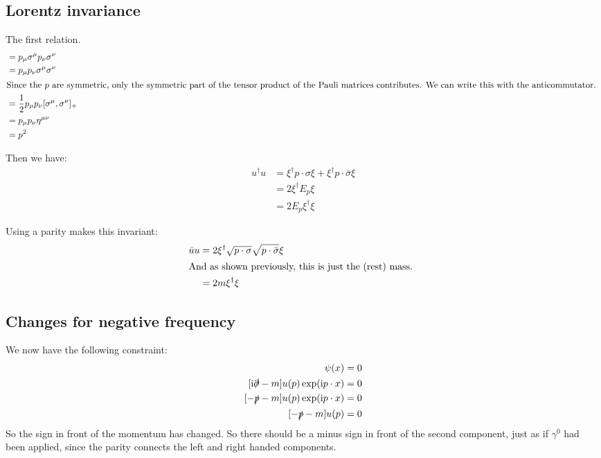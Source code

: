 \documentclass[11pt, english, fleqn, DIV=15, headinclude, BCOR=1cm]{scrartcl}
\begin{document}
\subsection{Lorentz invariance}

The first relation.
\begin{align*}
    [p \cdot \sigma][p \cdot \bar\sigma]
    &= p_\mu \sigma^\mu p_\nu \sigma^\nu \\
    &= p_\mu p_\nu \sigma^\mu \sigma^\nu \\
    \intertext{%
        Since the $p$ are symmetric, only the symmetric part of the tensor
        product of the Pauli matrices contributes. We can write this with the
        anticommutator.
    }
    &= \frac12 p_\mu p_\nu [\sigma^\mu, \sigma^\nu]_+ \\
    &= p_\mu p_\nu \eta^{\mu\nu} \\
    &= p^2
\end{align*}

Then we have:
\begin{align*}
    u^\dagger u
    &= \xi^\dagger p \cdot \sigma \xi + \xi^\dagger p \cdot \bar\sigma \xi \\
    &= 2 \xi^\dagger E_p \xi \\
    &= 2 E_p \xi^\dagger \xi
\end{align*}

Using a parity makes this invariant:
\begin{align*}
    \bar u u
    &= 2 \xi^\dagger \sqrt{p \cdot \sigma} \sqrt{p \cdot \bar\sigma} \xi \\
    \intertext{%
        And as shown previously, this is just the (rest) mass.
    }
    &= 2 m \xi^\dagger \xi
\end{align*}

\subsection{Changes for negative frequency}

We now have the following constraint:
\begin{align*}
    [\iup \slashed\partial - m] \psi(x) &= 0 \\
    [\iup \slashed\partial - m] u(p) \exp(\iup p \cdot x) &= 0 \\
    [- \slashed p - m] u(p) \exp(\iup p \cdot x) &= 0 \\
    [- \slashed p - m] u(p) &= 0
\end{align*}
So the sign in front of the momentum has changed. So there should be a minus
sign in front of the second component, just as if $\gamma^0$ had been applied,
since the parity connects the left and right handed components.
\end{document}
